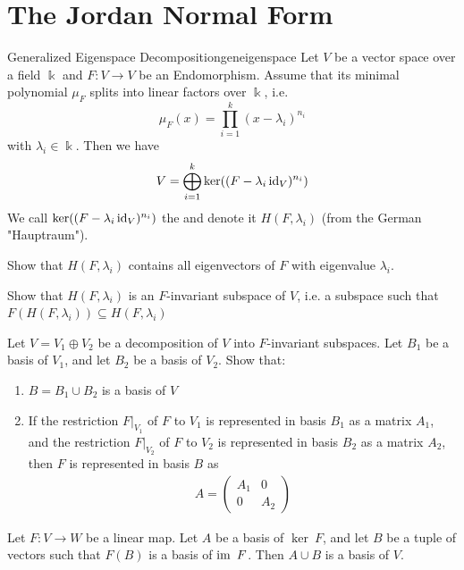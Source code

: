 \section{The Jordan Normal Form}
\begin{importantcorollary}{Generalized Eigenspace Decomposition}{geneigenspace}
	Let $V$ be a vector space over a field $\Bbbk$ and $F : V \to V$ be an Endomorphism. Assume that its minimal polynomial $\mu_F$ splits into linear factors over $\Bbbk$, i.e. $$\mu_F(x) = \prod_{i = 1}^k(x - \lambda_i)^{n_i}$$ with $\lambda_i \in \Bbbk$. Then we have
	\begin{align*}
		V = \bigoplus_{i = 1}^k \ker((F - \lambda_i \operatorname{id}_V)^{n_i})
	\end{align*}
	We call $\ker((F - \lambda_i \operatorname{id}_V)^{n_i})$ the  and denote it $H(F, \lambda_i)$ (from the German "Hauptraum").
\end{importantcorollary}
\begin{exercise}
	Show that $H(F,\lambda_i)$ contains all eigenvectors of $F$ with eigenvalue $\lambda_i$.
\end{exercise}
\begin{exercise}
	\label{res:hauptrauminvariant}
	Show that $H(F,\lambda_i)$ is an $F$-invariant subspace of $V$, i.e. a subspace such that $F(H(F,\lambda_i)) \subseteq H(F,\lambda_i)$
\end{exercise}
\begin{exercise}
	\label{res:matrixdirectsum}
	Let $V = V_1 \oplus V_2$ be a decomposition of $V$ into $F$-invariant subspaces. Let $B_1$ be a basis of $V_1$, and let $B_2$ be a basis of $V_2$. Show that:
	\begin{enumerate}
		\item $B = B_1 \cup B_2$ is a basis of $V$
		\item If the restriction $F|_{V_1}$ of $F$ to $V_1$ is represented in basis $B_1$ as a matrix $A_1$, and the restriction $F|_{V_2}$ of $F$ to $V_2$ is represented in basis $B_2$ as a matrix $A_2$, then $F$ is represented in basis $B$ as
		\begin{align*}
			A = 
			\begin{pmatrix}
				A_1 & 0\\
				0 & A_2
			\end{pmatrix}
		\end{align*}
	\end{enumerate}
\end{exercise}
\begin{exercise}
	\label{res:twobases}
	Let $F : V \to W$ be a linear map. Let $A$ be a basis of $\ker~ F$, and let $B$ be a tuple of vectors such that $F(B)$ is a basis of $\operatorname{im}~ F$. Then $A \cup B$ is a basis of $V$.
\end{exercise}
